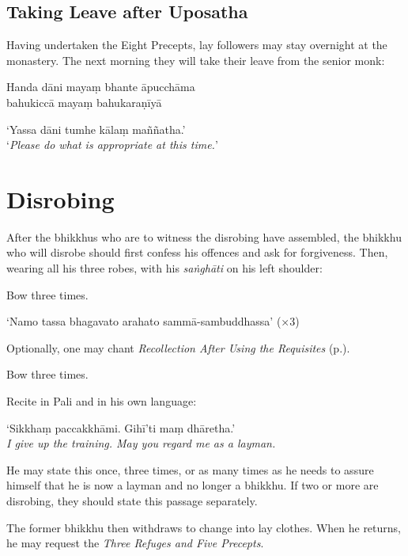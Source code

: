 \subsection{Taking Leave after Uposatha}

Having undertaken the Eight Precepts, lay followers may stay overnight at the monastery. The next
morning they will take their leave from the senior monk:


Handa dāni mayaṃ bhante āpucchāma\\
bahukiccā mayaṃ bahukaraṇīyā


‘Yassa dāni tumhe kālaṃ maññatha.’\\
‘\emph{Please do what is appropriate at this time.}’

\ifhandbookedition
\clearpage
\fi

\section{Disrobing}

After the bhikkhus who are to witness the disrobing have assembled, the bhikkhu
who will disrobe should first confess his offences and ask for forgiveness. Then, wearing all his three
robes, with his \emph{saṅghāti} on his left shoulder:

Bow three times.

‘Namo tassa bhagavato arahato sammā-sambuddhassa’ (×3)

Optionally, one may chant \emph{Recollection After Using the Requisites}
(p.\pageref{recollection-after-using}).

Bow three times.

Recite in Pali and in his own language:

‘Sikkhaṃ paccakkhāmi. Gihī'ti maṃ dhāretha.’\\
\emph{I give up the training. May you regard me as a layman.}

He may state this once, three times, or as many times as he needs to assure
himself that he is now a layman and no longer a bhikkhu. If two or more are
disrobing, they should state this passage separately.

The former bhikkhu then withdraws to change into lay clothes. When he returns,
he may request the \emph{Three Refuges and Five Precepts}.

